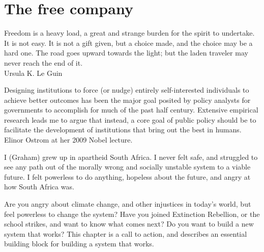 ﻿\chapter{The free company}
\label{chapter:ownership}




\begin{chapterquotation}
Freedom is a heavy load, a great and strange burden for the spirit to undertake. It is not easy. It is not a gift given, but a choice made, and the choice may be a hard one. The road goes upward towards the light; but the laden traveler may never reach the end of it.\\
\raggedleft\textemdash Ursula K. Le Guin


\centering
Designing institutions to force (or nudge) entirely self-interested individuals to achieve better outcomes has been the major goal posited by policy analysts for governments to accomplish for much of the past half century. Extensive empirical research leads me to argue that instead, a core goal of public policy should be to facilitate the development of institutions that bring out the best in humans.\\
\raggedleft\textemdash Elinor Ostrom at her 2009 Nobel lecture.
\end{chapterquotation}




I (Graham) grew up in apartheid South Africa. I never felt safe, and struggled to see any path out of the morally wrong and socially unstable system to a viable future. I felt powerless to do anything, hopeless about the future, and angry at how South Africa was.


Are you angry about climate change, and other injustices in today’s world, but feel powerless to change the system? Have you joined Extinction Rebellion, or the school strikes, and want to know what comes next? Do you want to build a new system that works? This chapter is a call to action, and describes an essential building block for building a system that works.


